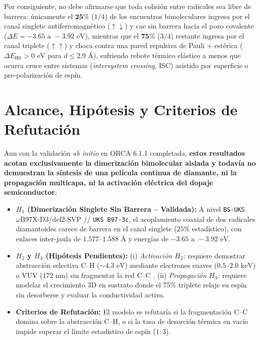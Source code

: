 \documentclass[10pt,twocolumn,a4paper]{article}
\begin{document}
Por consiguiente, no debe afirmarse que toda colisión entre radicales sea libre de barrera: únicamente el $\mathbf{25\%}$ ($1/4$) de los encuentros bimoleculares ingresa por el canal singlete antiferromagnético ($\uparrow\downarrow$) y cae sin barrera hacia el pozo covalente ($\Delta E = -3.65\text{ a }-3.92\text{ eV}$), mientras que el $\mathbf{75\%}$ ($3/4$) restante ingresa por el canal triplete ($\uparrow\uparrow$) y choca contra una pared repulsiva de Pauli + estérica ($\Delta E_{\text{HS}} > 0\text{ eV}$ para $d \le 2.9\text{ \AA}$), sufriendo rebote térmico elástico a menos que ocurra cruce entre sistemas (\textit{intersystem crossing}, ISC) asistido por superficie o pre-polarización de espín.

\section{Alcance, Hipótesis y Criterios de Refutación}
Aun con la validación \textit{ab initio} en ORCA 6.1.1 completada, \textbf{estos resultados acotan exclusivamente la dimerización bimolecular aislada y todavía no demuestran la síntesis de una película continua de diamante, ni la propagación multicapa, ni la activación eléctrica del dopaje semiconductor}:
\begin{itemize}\setlength{\itemsep}{1pt}\setlength{\parskip}{0pt}
    \item \textbf{$H_1$ (Dimerización Singlete Sin Barrera -- Validada):} A nivel \texttt{BS-UKS} $\omega\text{B97X-D3/def2-SVP}$ // \texttt{UKS B97-3c}, el acoplamiento coaxial de dos radicales diamantoides carece de barrera en el canal singlete ($25\%$ estadístico), con enlaces inter-jaula de $1.577\text{--}1.588\text{ \AA}$ y energías de $-3.65\text{ a }-3.92\text{ eV}$.
    \item \textbf{$H_2$ y $H_3$ (Hipótesis Pendientes):} (i) \textit{Activación $H_2$:} requiere demostrar abstracción selectiva $\text{C--H}$ ($\sim 4.3\text{ eV}$) mediante electrones suaves ($0.5\text{--}2.0\text{ keV}$) o VUV ($172\text{ nm}$) sin fragmentar la red $\text{C--C}$ \cite{Fu2025}. (ii) \textit{Propagación $H_3$:} requiere modelar el crecimiento 3D en sustrato donde el $75\%$ triplete relaje su espín sin desorberse y evaluar la conductividad activa.
    \item \textbf{Criterios de Refutación:} El modelo se refutaría si la fragmentación $\text{C--C}$ domina sobre la abstracción $\text{C--H}$, o si la tasa de desorción térmica en vacío impide superar el límite estadístico de espín ($1:3$).
\end{itemize}
\end{document}
